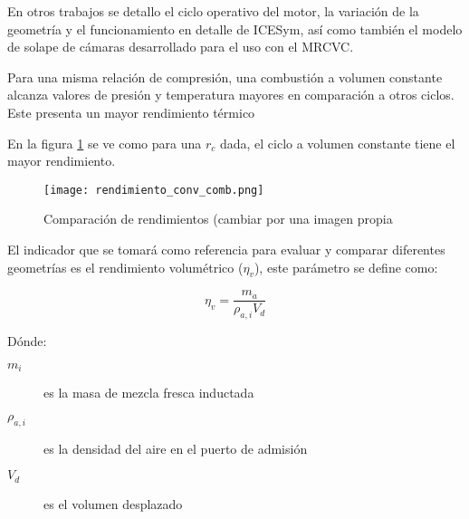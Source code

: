 En otros trabajos se detallo el ciclo operativo del motor, la variación de la
geometría y el funcionamiento en detalle de ICESym, así como también el modelo
de solape de cámaras desarrollado para el uso con el MRCVC.
%

Para una misma relación de compresión, una combustión a volumen constante
alcanza valores de presión y temperatura mayores en comparación a otros ciclos.
%
Este presenta un mayor rendimiento térmico


En la figura \ref{fig:comparacion_rendimientos} se ve como para una $r_c$ dada,
el ciclo a volumen constante tiene el mayor rendimiento.

\begin{figure}
    \centering
    \texttt{[image: rendimiento\_conv\_comb.png]}
    \caption{Comparación de rendimientos (cambiar por una imagen propia}
    \label{fig:comparacion_rendimientos}
\end{figure}


%
%
%
%

El indicador que se tomará como referencia para evaluar y comparar diferentes
geometrías es el rendimiento volumétrico ($\eta_v$), este parámetro se define
como:

\begin{equation}
    \eta_v = \frac{m_a}{\rho_{a,i}V_d}
\end{equation}

Dónde:
%
\begin{description}
    \item[$m_i$] es la masa de mezcla fresca inductada
    \item[$\rho_{a,i}$] es la densidad del aire en el puerto de admisión
    \item[$V_d$] es el volumen desplazado
\end{description}

